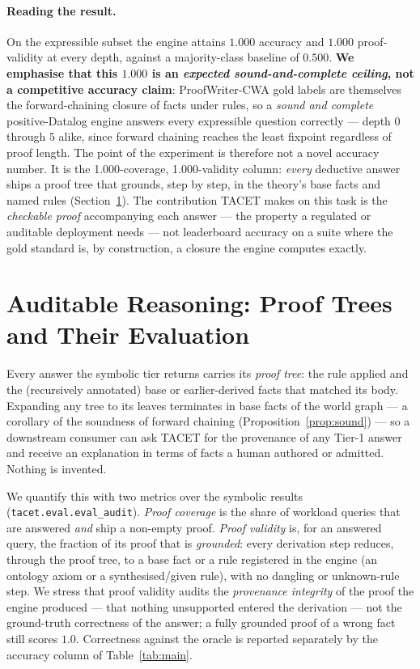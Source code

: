 \documentclass[11pt]{article}
\theoremstyle{plain}
\newcommand{\pwAccOverall}{1.000}
\newcommand{\pwProofCov}{1.000}
\newcommand{\pwProofVal}{1.000}
\begin{document}
\paragraph{Reading the result.} On the expressible subset the engine attains
$\pwAccOverall{}$ accuracy and $\pwProofVal{}$ proof-validity at every depth,
against a majority-class baseline of $0.500$. \textbf{We emphasise that this
$1.000$ is an \emph{expected sound-and-complete ceiling}, not a competitive
accuracy claim}: ProofWriter-CWA
gold labels are themselves the forward-chaining closure of facts under rules, so
a \emph{sound and complete} positive-Datalog engine answers every expressible
question correctly --- depth $0$ through $5$ alike, since forward chaining
reaches the least fixpoint regardless of proof length. The point of the
experiment is therefore not a novel accuracy number. It is the
\pwProofCov{}-coverage, \pwProofVal{}-validity column: \emph{every} deductive
answer ships a proof tree that grounds, step by step, in the theory's base facts
and named rules (Section~\ref{sec:audit}). The contribution TACET makes on this
task is the \emph{checkable proof} accompanying each answer --- the property a
regulated or auditable deployment needs --- not leaderboard accuracy on a suite
where the gold standard is, by construction, a closure the engine computes
exactly.

\section{Auditable Reasoning: Proof Trees and Their Evaluation}
\label{sec:audit}

Every answer the symbolic tier returns carries its \emph{proof tree}: the rule
applied and the (recursively annotated) base or earlier-derived facts that
matched its body. Expanding any tree to its leaves terminates in base facts of
the world graph --- a corollary of the soundness of forward chaining
(Proposition~\ref{prop:sound}) --- so a downstream consumer can ask TACET for
the provenance of any Tier-1 answer and receive an explanation in terms of
facts a human authored or admitted. Nothing is invented.

We quantify this with two metrics over the symbolic results
(\texttt{tacet.eval.eval\_audit}). \emph{Proof coverage} is the share of workload
queries that are answered \emph{and} ship a non-empty proof. \emph{Proof
validity} is, for an answered query, the fraction of its proof that is
\emph{grounded}: every derivation step reduces, through the proof tree, to a
base fact or a rule registered in the engine (an ontology axiom or a
synthesised/given rule), with no dangling or unknown-rule step. We stress that
proof validity audits the \emph{provenance integrity} of the proof the engine
produced --- that nothing unsupported entered the derivation --- not the
ground-truth correctness of the answer; a fully grounded proof of a wrong fact
still scores $1.0$. Correctness against the oracle is reported separately by the
accuracy column of Table~\ref{tab:main}.
\end{document}
